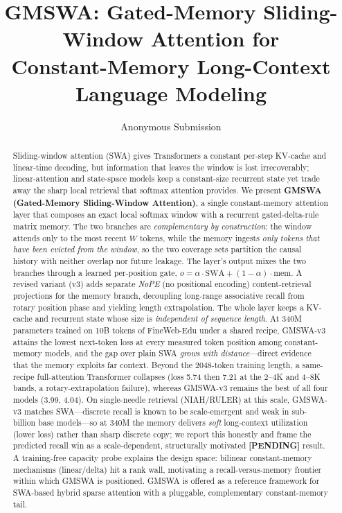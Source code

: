 \documentclass[letterpaper]{article} %
\title{GMSWA: Gated-Memory Sliding-Window Attention for\\
Constant-Memory Long-Context Language Modeling}
\author{
    Anonymous Submission
}
\newcommand{\pending}{\textbf{[PENDING]}}
\begin{document}
\maketitle

\begin{abstract}
Sliding-window attention (SWA) gives Transformers a constant per-step KV-cache and linear-time decoding, but information that leaves the window is lost irrecoverably; linear-attention and state-space models keep a constant-size recurrent state yet trade away the sharp local retrieval that softmax attention provides. We present \textbf{GMSWA (Gated-Memory Sliding-Window Attention)}, a single constant-memory attention layer that composes an exact local softmax window with a recurrent gated-delta-rule matrix memory. The two branches are \emph{complementary by construction}: the window attends only to the most recent $W$ tokens, while the memory ingests \emph{only tokens that have been evicted from the window}, so the two coverage sets partition the causal history with neither overlap nor future leakage. The layer's output mixes the two branches through a learned per-position gate, $o = \alpha\cdot\mathrm{SWA} + (1-\alpha)\cdot\mathrm{mem}$. A revised variant (v3) adds separate \emph{NoPE} (no positional encoding) content-retrieval projections for the memory branch, decoupling long-range associative recall from rotary position phase and yielding length extrapolation. The whole layer keeps a KV-cache and recurrent state whose size is \emph{independent of sequence length}. At 340M parameters trained on 10B tokens of FineWeb-Edu under a shared recipe, GMSWA-v3 attains the lowest next-token loss at every measured token position among constant-memory models, and the gap over plain SWA \emph{grows with distance}---direct evidence that the memory exploits far context. Beyond the 2048-token training length, a same-recipe full-attention Transformer collapses (loss 5.74 then 7.21 at the 2--4K and 4--8K bands, a rotary-extrapolation failure), whereas GMSWA-v3 remains the best of all four models (3.99, 4.04). On single-needle retrieval (NIAH/RULER) at this scale, GMSWA-v3 matches SWA---discrete recall is known to be scale-emergent and weak in sub-billion base models---so at 340M the memory delivers \emph{soft} long-context utilization (lower loss) rather than sharp discrete copy; we report this honestly and frame the predicted recall win as a scale-dependent, structurally motivated \pending{} result. A training-free capacity probe explains the design space: bilinear constant-memory mechanisms (linear/delta) hit a rank wall, motivating a recall-versus-memory frontier within which GMSWA is positioned. GMSWA is offered as a reference framework for SWA-based hybrid sparse attention with a pluggable, complementary constant-memory tail.
\end{abstract}
\end{document}

